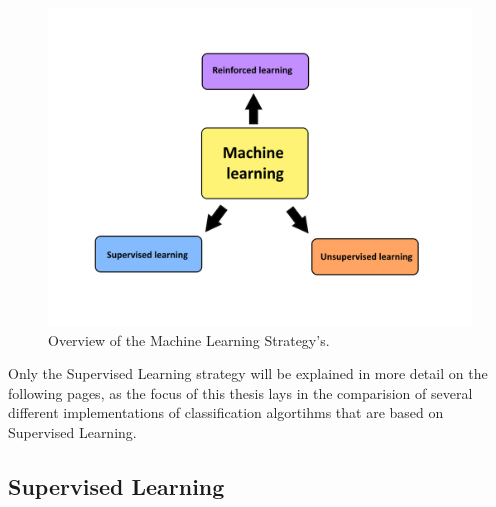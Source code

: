 \documentclass[12pt,oneside,a4paper,parskip]{scrbook}
\begin{document}
\begin{figure}
  \includegraphics[width=\linewidth]{Overview_ml}
  \caption{Overview of the Machine Learning Strategy's.}
  \label{fig:overview_ML}
\end{figure}

Only the Supervised Learning strategy will be explained in more detail on the following pages, as the focus of this 
thesis lays in the comparision of several different implementations of classification algortihms that are based on 
Supervised Learning.
 

\cite{IntroML}

\subsection{Supervised Learning}
\end{document}
